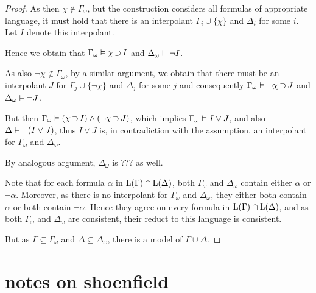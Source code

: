 \begin{proof}
As then $\chi \not\in \Gamma_\omega$, but the construction considers all formulas of appropriate language, it must hold that there is an interpolant $\Gamma_i \cup \{\chi\}$ and $\Delta_i$ for some $i$.
Let $I$ denote this interpolant.

Hence we obtain that $\Gamma_\omega \vDash \chi \operatorname{\supset} I$ 
and $\Delta_\omega \vDash \lnot I$.

As also $\lnot\chi \not\in \Gamma_\omega$, by a similar argument, we obtain that 
there must be an interpolant $J$ for $\Gamma_j \cup \{\lnot \chi\}$ and $\Delta_j$ for some $j$ and consequently
$\Gamma_\omega \vDash \lnot \chi \operatorname{\supset} J$ 
and $\Delta_\omega \vDash \lnot J$.

But then
$\Gamma_\omega \vDash (\chi \operatorname{\supset} I) \land (\lnot \chi \operatorname{\supset} J)$, which implies $\Gamma_\omega \vDash I\lor J$, and also $\Delta\vDash \lnot (I \lor J)$, thus $I\lor J$ is, in contradiction with the assumption, an interpolant for $\Gamma_\omega$ and $\Delta_\omega$.

By analogous argument, $\Delta_\omega$ is ??? as well. 

Note that for each formula $\alpha$ in $\operatorname{L}(\Gamma) \cap \operatorname{L}(\Delta)$,
both $\Gamma_\omega$ and $\Delta_\omega$ contain either $\alpha$ or $\lnot \alpha$.
Moreover, as there is no interpolant for $\Gamma_\omega$ and $\Delta_\omega$, they either both contain $\alpha$ or both contain $\lnot \alpha$.
Hence they agree on every formula in $\operatorname{L}(\Gamma) \cap \operatorname{L}(\Delta)$, and as both $\Gamma_\omega$ and $\Delta_\omega$ are consistent, their reduct to this language is consistent.

But as $\Gamma \subseteq \Gamma_\omega$ and 
$\Delta \subseteq \Delta_\omega$, there is a model of $\Gamma \cup \Delta$.






\end{proof}


\clearpage



\section{notes on shoenfield}

